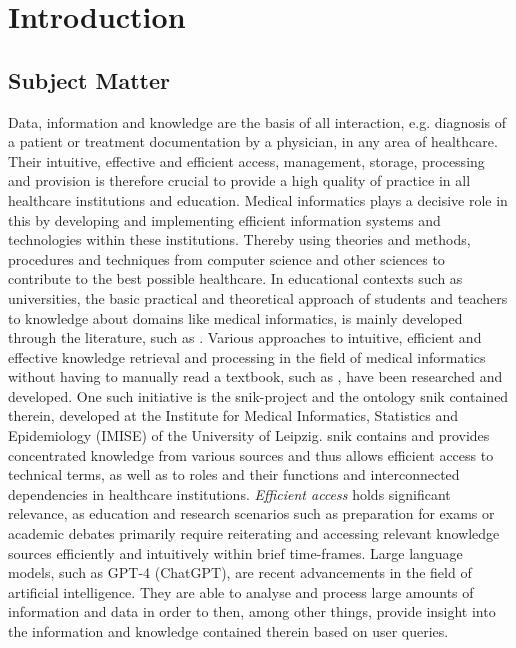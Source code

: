 \chapter{Introduction}\label{ch:introduction}
\section{Subject Matter}\label{sec:subject matter}
Data, information and knowledge are the basis of all interaction, e.g. diagnosis of a patient or treatment documentation by a physician, in any area of healthcare.
Their intuitive, effective and efficient access, management, storage, processing and provision is therefore crucial to provide a high quality of practice in all healthcare institutions and education.
%
Medical informatics plays a decisive role in this by developing and implementing efficient information systems and technologies within these institutions. 
Thereby using theories and methods, procedures and techniques from computer science and other sciences to contribute to the best possible healthcare. 
%
In educational contexts such as universities, the basic practical and theoretical approach of students and teachers to knowledge about domains like medical informatics, is mainly developed through the literature, such as \citet{bb2}.
%
Various approaches to intuitive, efficient and effective knowledge retrieval and processing in the field of medical informatics without having to manually read a textbook, such as \citet{bb2}, have been researched and developed.
%
One such initiative is the \ac{snik}-project and the ontology \ac{snik} contained therein, developed at the Institute for Medical Informatics, Statistics and Epidemiology (IMISE) of the University of Leipzig.
\ac{snik} contains and provides concentrated knowledge from various sources and thus allows efficient access to technical terms, as well as to roles and their functions and interconnected dependencies in healthcare institutions. 
%
\textit{Efficient access} holds significant relevance, as education and research scenarios such as preparation for exams or academic debates primarily require reiterating and accessing relevant knowledge sources efficiently and intuitively within brief time-frames.
%
Large language models, such as GPT-4 (ChatGPT), are recent advancements in the field of artificial intelligence.
They are able to analyse and process large amounts of information and data in order to then, among other things, provide insight into the information and knowledge contained therein based on user queries. 

